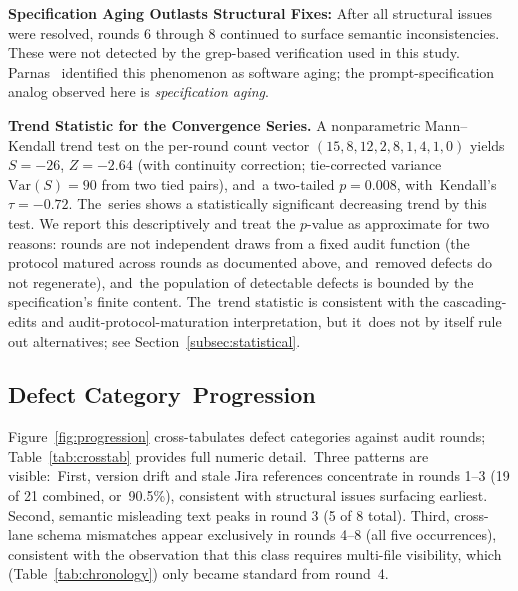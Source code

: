 \documentclass[software,article,accept,pdftex,oneauthor]{Definitions/mdpi}
\def\hl#1{#1}
\begin{document}
\textbf{\hl{Specification Aging Outlasts Structural Fixes:}} After all structural issues were resolved, rounds 6 through 8 continued to surface semantic inconsistencies. These were not detected by the grep-based verification used in this study. Parnas~\cite{parnas1994software} identified this phenomenon as software aging; the prompt-specification analog observed here is \emph{\hl{specification aging}}.

\textbf{\hl{Trend Statistic for the Convergence Series.}} A nonparametric Mann--Kendall trend test on the per-round count vector $(15, 8, 12, 2, 8, 1, 4, 1, 0)$ yields $S = -26$, $Z = -2.64$ (with continuity correction; tie-corrected variance $\mathrm{Var}(S) = 90$ from two tied pairs), and~a two-tailed $p = 0.008$, with~Kendall's $\tau = -0.72$. The~series shows a statistically significant decreasing trend by this test. We report this descriptively and treat the $p$-value as approximate for two reasons: rounds are not independent draws from a fixed audit function (the protocol matured across rounds as documented above, and~removed defects do not regenerate), and~the population of detectable defects is bounded by the specification's finite content. The~trend statistic is consistent with the cascading-edits and audit-protocol-maturation interpretation, but it~does not by itself rule out alternatives; see Section~\ref{subsec:statistical}.

\subsection{Defect Category~Progression}

Figure~\ref{fig:progression} cross-tabulates defect categories against audit rounds; Table~\ref{tab:crosstab} provides full numeric detail.~Three patterns are visible:~First, version drift and stale Jira references concentrate in rounds 1--3 (19 of 21 combined, or~90.5\%), consistent with structural issues surfacing earliest. Second, semantic misleading text peaks in round 3 (5 of 8 total). Third, cross-lane schema mismatches appear exclusively in rounds 4--8 (all five occurrences), consistent with the observation that this class requires multi-file visibility, which (Table~\ref{tab:chronology}) only became standard from round~4.
\end{document}
